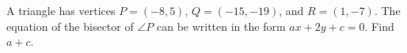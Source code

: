 A triangle has vertices $P=(-8,5)$, $Q=(-15,-19)$, and $R=(1,-7)$. The equation of the bisector of $\angle P$ can be written in the form $ax+2y+c=0$. Find $a+c$.
